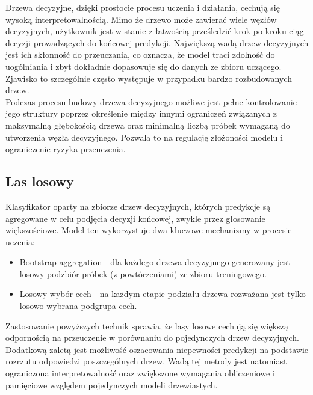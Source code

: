 \documentclass[a4paper,twoside,12pt]{book}
\begin{document}
Drzewa decyzyjne, dzięki prostocie procesu uczenia i działania, cechują się wysoką interpretowalnością. Mimo że drzewo może zawierać wiele węzłów decyzyjnych, użytkownik jest w stanie z łatwością prześledzić krok po kroku ciąg decyzji prowadzących do końcowej predykcji.
Największą wadą drzew decyzyjnych jest ich skłonność do przeuczania, co oznacza, że model traci zdolność do uogólniania i zbyt dokładnie dopasowuje się do danych ze zbioru uczącego. Zjawisko to szczególnie często występuje w przypadku bardzo rozbudowanych drzew.\\

Podczas procesu budowy drzewa decyzyjnego możliwe jest pełne kontrolowanie jego struktury poprzez określenie między innymi ograniczeń związanych z maksymalną głębokością drzewa oraz minimalną liczbą próbek wymaganą do utworzenia węzła decyzyjnego. Pozwala to na regulację złożoności modelu i ograniczenie ryzyka przeuczenia.
\subsection*{Las losowy}
Klasyfikator oparty na zbiorze drzew decyzyjnych, których predykcje są agregowane w celu podjęcia decyzji końcowej, zwykle przez głosowanie większościowe. Model ten wykorzystuje dwa kluczowe mechanizmy w procesie uczenia:

\begin{itemize}
	\item Bootstrap aggregation - dla każdego drzewa decyzyjnego generowany jest losowy podzbiór próbek (z powtórzeniami) ze zbioru treningowego.
	\item Losowy wybór cech - na każdym etapie podziału drzewa rozważana jest tylko losowo wybrana podgrupa cech.
\end{itemize}

Zastosowanie powyższych technik sprawia, że lasy losowe cechują się większą odpornością na przeuczenie w porównaniu do pojedynczych drzew decyzyjnych. Dodatkową zaletą jest możliwość oszacowania niepewności predykcji na podstawie rozrzutu odpowiedzi poszczególnych drzew. Wadą tej metody jest natomiast ograniczona interpretowalność oraz zwiększone wymagania obliczeniowe i pamięciowe względem pojedynczych modeli drzewiastych.
\end{document}
